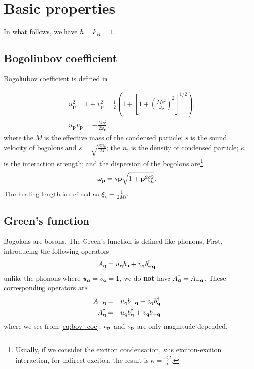 \chapter{Basic properties}
In what follows, we have $\hbar = k_B=1$.

\section{Bogoliubov coefficient}\label{sec:BovCoef}
Bogoliubov coefficient is defined in~\cite{Giorgini1998}

\begin{eqnarray}\label{eq:bov_coe}
&&u^2_{\mathbf{p}}=1+v^2_{\mathbf{p}}=\frac{1}{2}\left(1+\left[1+\left(\frac{Ms^2}{\omega_{\mathbf{p}}}\right)^2\right]^{1/2}\right),
\\
&&u_{\mathbf{p}}v_{\mathbf{p}}=-\frac{Ms^2}{2\omega_{\mathbf{p}}},
\end{eqnarray}
where the $M$ is the effective mass of the condensed particle; $s$ is the sound velocity of bogolons and $s= \sqrt{\frac{\kappa n_c}{M}}$; the $n_c$ is the density of condensed particle; $\kappa$ is the interaction strength; and the dispersion of the bogolons are\footnote{
Usually, if we consider the exciton condensation, $\kappa$ is exciton-exciton interaction, for indirect exciton, the result is $\kappa = \frac{e_0^2 d}{\epsilon}$.
}
%
\begin{equation}\label{eq:bov_disp}
  \omega_{\mathbf{p}} = s\mathbf{p} \sqrt{1+\mathbf{p}^2 \xi_h^2}.
\end{equation}
The healing length is defined as $\xi_h=\frac{1}{2Ms}$.

\section{Green's function}\label{sec:Green}
Bogolons are bosons.
The Green's function is defined like phonons,
First, introducing the following operators
\begin{equation}\label{eq:Aq}
  A_{\mathbf{q}} = u_{\mathbf{q}} b_{\mathbf{p}} + v_{\mathbf{q}} b^\dagger_{-\mathbf{q}}
\end{equation}
unlike the phonons where $u_{\mathbf{q}} =v_{\mathbf{q}}=1$, we do \textbf{not} have $A_{\mathbf{q}}^\dagger = A_{-\mathbf{q}}$.
These corresponding operators are
\begin{eqnarray}
  A_{-\mathbf{q}} &=& u_{\mathbf{q}} b_{-\mathbf{q}} + v_{\mathbf{q}} b^\dagger_{\mathbf{q}} \label{eq:Aq1} \\
  A_{\mathbf{q}}^\dagger &=& u_{\mathbf{q}} b_{\mathbf{q}}^\dagger + v_{\mathbf{q}} b_{-\mathbf{q}} \label{eq:Aq2}
\end{eqnarray}
where we see from \eqref{eq:bov_coe}, $u_{\mathbf{p}}$ and $v_{\mathbf{p}}$ are only magnitude depended.


